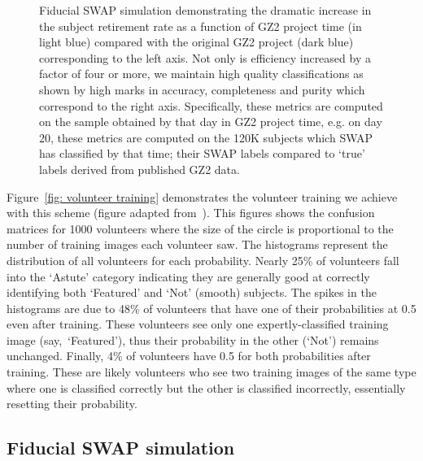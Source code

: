 \documentclass[twocolumn]{aastex6}
\newcommand{\feat}{`Featured'}
\newcommand{\notfeat}{`Not'}
\begin{document}
\begin{figure}[ht!]
\caption{Fiducial SWAP simulation demonstrating the dramatic increase in the subject retirement rate as a function of GZ2 project time (in light blue) compared with the original GZ2 project (dark blue) corresponding to the left axis. Not only is efficiency increased by a factor of four or more, we maintain high quality classifications as shown by high marks in accuracy, completeness and purity which correspond to the right axis.  Specifically, these metrics are computed on the sample obtained by that day in GZ2 project time, e.g. on day 20, these metrics are computed on the 120K subjects which SWAP has classified by that time; their SWAP labels compared to `true' labels derived from published GZ2 data. \label{fig: fiducial run}}
\end{figure}

Figure~\ref{fig: volunteer training} demonstrates the volunteer training we achieve
with this scheme (figure adapted from~\cite{Marshall2016}). 
This figures shows the confusion matrices for 1000 volunteers
where the size of the circle is proportional to the number of training images each
volunteer saw. The histograms represent the distribution of all volunteers for each 
probability.  Nearly 25\% of volunteers fall into the `Astute' category indicating
they are generally good at correctly identifying both `Featured' and `Not' (smooth) subjects.
The spikes in the histograms are due to 48\% of volunteers that have one of their 
probabilities at 0.5 even after training. These volunteers see only one 
expertly-classified training image (say,~\feat), thus their probability in the 
other (\notfeat) remains unchanged.
Finally, 4\% of volunteers have 0.5 for both probabilities after training. 
These are likely volunteers who see two training images of the same type where
one is classified correctly but the other is classified incorrectly, essentially resetting 
their probability. 


\subsection{Fiducial SWAP simulation}\label{sec: fiducial}
\end{document}
